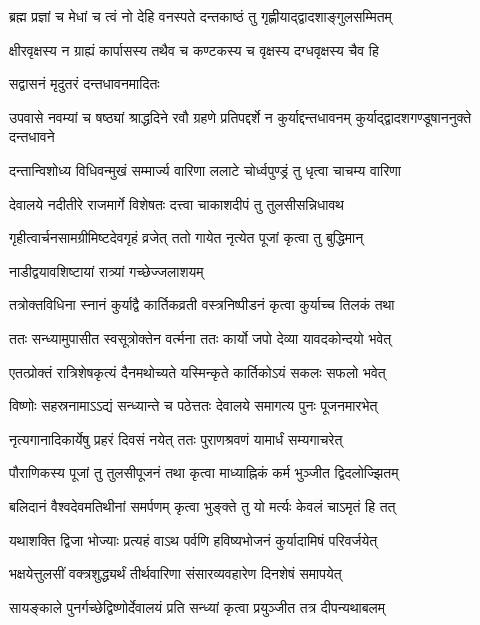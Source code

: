 \twolineshloka
{ब्रह्म प्रज्ञां च मेधां च त्वं नो देहि वनस्पते}
{दन्तकाष्ठं तु गृह्णीयाद्द्वादशाङ्गुलसम्मितम्} %

\twolineshloka
{क्षीरवृक्षस्य न ग्राह्यं कार्पासस्य तथैव च}
{कण्टकस्य च वृक्षस्य दग्धवृक्षस्य चैव हि} %


\onelineshloka
{सद्वासनं मृदुतरं दन्तधावनमादितः} %

\threelineshloka
{उपवासे नवम्यां च षष्ठ्यां श्राद्धदिने रवौ}
{ग्रहणे प्रतिपद्दर्शे न कुर्याद्दन्तधावनम्}
{कुर्याद्द्वादशगण्डूषाननुक्ते दन्तधावने} %

\twolineshloka
{दन्तान्विशोध्य विधिवन्मुखं सम्मार्ज्य वारिणा}
{ललाटे चोर्ध्वपुण्ड्रं तु धृत्वा चाचम्य वारिणा} %

\twolineshloka
{देवालये नदीतीरे राजमार्गे विशेषतः}
{दत्त्वा चाकाशदीपं तु तुलसीसन्निधावथ} %

\twolineshloka
{गृहीत्वार्चनसामग्रीमिष्टदेवगृहं व्रजेत्}
{ततो गायेत नृत्येत पूजां कृत्वा तु बुद्धिमान्} %



\onelineshloka
{नाडीद्वयावशिष्टायां रात्र्यां गच्छेज्जलाशयम्} %

\twolineshloka
{तत्रोक्तविधिना स्नानं कुर्याद्वै कार्तिकव्रती}
{वस्त्रनिष्पीडनं कृत्वा कुर्याच्च तिलकं तथा} %

\twolineshloka
{ततः सन्ध्यामुपासीत स्वसूत्रोक्तेन वर्त्मना}
{ततः कार्यो जपो देव्या यावदकोन्दयो भवेत्} %

\twolineshloka
{एतत्प्रोक्तं रात्रिशेषकृत्यं दैनमथोच्यते}
{यस्मिन्कृते कार्तिकोऽयं सकलः सफलो भवेत्} %

\twolineshloka
{विष्णोः सहस्रनामाऽऽद्यं सन्ध्यान्ते च पठेत्ततः}
{देवालये समागत्य पुनः पूजनमारभेत्} %

\twolineshloka
{नृत्यगानादिकार्येषु प्रहरं दिवसं नयेत्}
{ततः पुराणश्रवणं यामार्धं सम्यगाचरेत्} %

\twolineshloka
{पौराणिकस्य पूजां तु तुलसीपूजनं तथा}
{कृत्वा माध्याह्निकं कर्म भुञ्जीत द्विदलोज्झितम्} %

\twolineshloka
{बलिदानं वैश्वदेवमतिथीनां समर्पणम्}
{कृत्वा भुङ्क्ते तु यो मर्त्यः केवलं चाऽमृतं हि तत्} %

\twolineshloka
{यथाशक्ति द्विजा भोज्याः प्रत्यहं वाऽथ पर्वणि}
{हविष्यभोजनं कुर्यादामिषं परिवर्जयेत्} %

\twolineshloka
{भक्षयेत्तुलसीं वक्त्रशुद्ध्यर्थं तीर्थवारिणा}
{संसारव्यवहारेण दिनशेषं समापयेत्} %

\twolineshloka
{सायङ्काले पुनर्गच्छेद्विष्णोर्देवालयं प्रति}
{सन्ध्यां कृत्वा प्रयुञ्जीत तत्र दीपन्यथाबलम्} %

